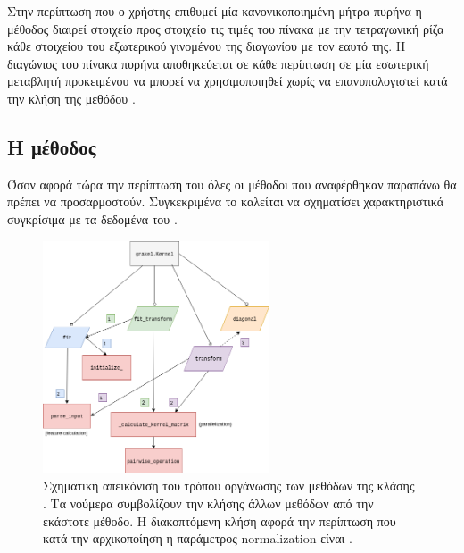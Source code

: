 Στην περίπτωση που ο χρήστης επιθυμεί μία κανονικοποιημένη μήτρα πυρήνα η μέθοδος \texttt{} διαιρεί στοιχείο προς στοιχείο τις τιμές του πίνακα με την τετραγωνική ρίζα κάθε στοιχείου του εξωτερικού γινομένου της διαγωνίου με τον εαυτό της.
Η διαγώνιος του πίνακα πυρήνα αποθηκεύεται σε κάθε περίπτωση σε μία εσωτερική μεταβλητή προκειμένου να μπορεί να χρησιμοποιηθεί χωρίς να επανυπολογιστεί κατά την κλήση της μεθόδου \texttt{}.
\subsection{Η μέθοδος \texttt{}}
Όσον αφορά τώρα την περίπτωση του \texttt{} όλες οι μέθοδοι που αναφέρθηκαν παραπάνω θα πρέπει να προσαρμοστούν.
Συγκεκριμένα το \texttt{} καλείται να σχηματίσει χαρακτηριστικά συγκρίσιμα με τα δεδομένα του \texttt{}.

\begin{figure}[]
    \centering
    \includegraphics[width=0.6\textwidth]{figures/KernelStructure.png}
    \caption{Σχηματική απεικόνιση του τρόπου οργάνωσης των μεθόδων της κλάσης . Τα νούμερα συμβολίζουν την κλήσης άλλων μεθόδων από την εκάστοτε μέθοδο. Η διακοπτόμενη κλήση αφορά την περίπτωση που κατά την αρχικοποίηση η παράμετρος normalization είναι .}
    \label{fig:kernel_structure}
\end{figure}

